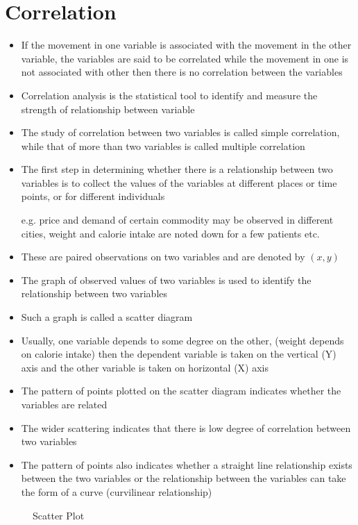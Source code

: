 \documentclass[
10pt, %
a4paper, %
]{report}
\begin{document}
\section{Correlation}
\begin{itemize}
\item If the movement in one variable is associated with the movement in the other variable, the variables are said to be correlated while the movement in one is not associated with other then there is no correlation between the variables
\item Correlation analysis is the statistical tool to identify and measure the strength of relationship between variable
\item The study of correlation between two variables is called simple correlation, while that of more than two variables is called multiple correlation
\item The first step in determining whether there is a relationship between two variables is to collect the values of the variables at different places or time points, or for different individuals
\item[e.g.] price and demand of certain commodity may be observed in different cities, weight and calorie intake are noted down for a few patients etc.
\item These are paired observations on two variables and are denoted by \((x, y)\)
\item The graph of observed values of two variables is used to identify the relationship between two variables
\item Such a graph is called a scatter diagram
\item Usually, one variable depends to some degree on the other, (weight depends on calorie intake) then the dependent variable is taken on the vertical (Y) axis and the other variable is taken on horizontal (X) axis
\item The pattern of points plotted on the scatter diagram indicates whether the variables are related
\item The wider scattering indicates that there is low degree of correlation between two variables
\item The pattern of points also indicates whether a straight line relationship exists between the two variables or the relationship between the variables can take the form of a curve (curvilinear relationship)
\end{itemize}

\begin{figure}[h!]
\begin{center}
\end{center}
\caption{Scatter Plot}
\label{fig:scatter}
\end{figure}
\end{document}
